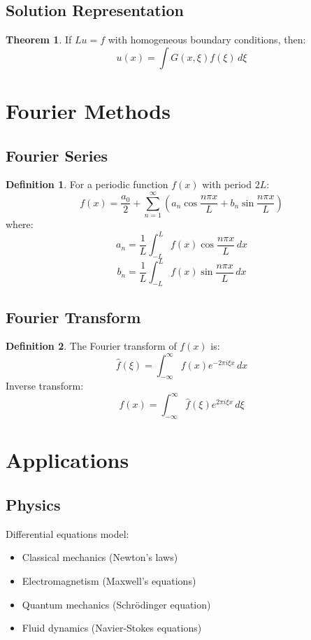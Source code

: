 \documentclass[11pt]{article}
\theoremstyle{definition}
\newtheorem{definition}{Definition}[section]
\newtheorem{theorem}{Theorem}[section]
\begin{document}
\subsection{Solution Representation}
\begin{theorem}
If $Lu = f$ with homogeneous boundary conditions, then:
$$u(x) = \int G(x,\xi) f(\xi) \, d\xi$$
\end{theorem}

\section{Fourier Methods}

\subsection{Fourier Series}
\begin{definition}
For a periodic function $f(x)$ with period $2L$:
$$f(x) = \frac{a_0}{2} + \sum_{n=1}^{\infty} \left(a_n \cos \frac{n\pi x}{L} + b_n \sin \frac{n\pi x}{L}\right)$$
where:
$$a_n = \frac{1}{L} \int_{-L}^L f(x) \cos \frac{n\pi x}{L} \, dx$$
$$b_n = \frac{1}{L} \int_{-L}^L f(x) \sin \frac{n\pi x}{L} \, dx$$
\end{definition}

\subsection{Fourier Transform}
\begin{definition}
The Fourier transform of $f(x)$ is:
$$\hat{f}(\xi) = \int_{-\infty}^{\infty} f(x) e^{-2\pi i \xi x} \, dx$$
Inverse transform:
$$f(x) = \int_{-\infty}^{\infty} \hat{f}(\xi) e^{2\pi i \xi x} \, d\xi$$
\end{definition}

\section{Applications}

\subsection{Physics}
Differential equations model:
\begin{itemize}
    \item Classical mechanics (Newton's laws)
    \item Electromagnetism (Maxwell's equations)
    \item Quantum mechanics (Schrödinger equation)
    \item Fluid dynamics (Navier-Stokes equations)
\end{itemize}
\end{document}
